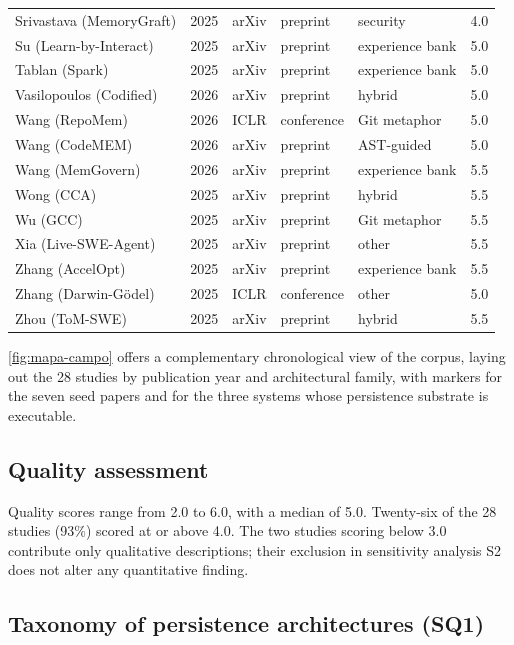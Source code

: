 \begin{longtable}{l c l l l S[table-format=1.1]}
  Srivastava (MemoryGraft) & 2025 & arXiv & preprint & security & 4.0 \\
  Su (Learn-by-Interact) & 2025 & arXiv & preprint & experience bank & 5.0 \\
  Tablan (Spark) & 2025 & arXiv & preprint & experience bank & 5.0 \\
  Vasilopoulos (Codified) & 2026 & arXiv & preprint & hybrid & 5.0 \\
  Wang (RepoMem) & 2026 & ICLR & conference & Git metaphor & 5.0 \\
  Wang (CodeMEM) & 2026 & arXiv & preprint & AST-guided & 5.0 \\
  Wang (MemGovern) & 2026 & arXiv & preprint & experience bank & 5.5 \\
  Wong (CCA) & 2025 & arXiv & preprint & hybrid & 5.5 \\
  Wu (GCC) & 2025 & arXiv & preprint & Git metaphor & 5.5 \\
  Xia (Live-SWE-Agent) & 2025 & arXiv & preprint & other & 5.5 \\
  Zhang (AccelOpt) & 2025 & arXiv & preprint & experience bank & 5.5 \\
  Zhang (Darwin-Gödel) & 2025 & ICLR & conference & other & 5.0 \\
  Zhou (ToM-SWE) & 2025 & arXiv & preprint & hybrid & 5.5 \\
\end{longtable}

\autoref{fig:mapa-campo} offers a complementary chronological view of
the corpus, laying out the 28 studies by publication year and
architectural family, with markers for the seven seed papers and for
the three systems whose persistence substrate is executable.



\FloatBarrier
\subsection{Quality assessment}
\label{sec:qualidade-resultados}

Quality scores range from 2.0 to 6.0, with a median of 5.0.
Twenty-six of the 28 studies (93\%) scored at or above 4.0.
The two studies scoring below
3.0~\citep{bui2026opendev,du2026memory} contribute only qualitative
descriptions; their exclusion in sensitivity analysis S2 does not
alter any quantitative finding.

\FloatBarrier
\subsection{Taxonomy of persistence architectures (SQ1)}
\label{sec:qs1}

